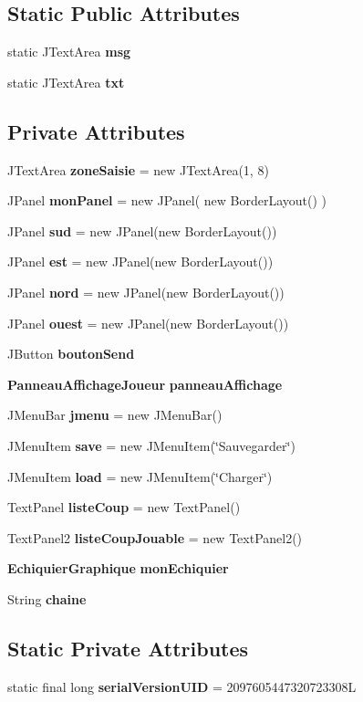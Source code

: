 \subsection*{Static Public Attributes}
\begin{DoxyCompactItemize}
\item 
static J\-Text\-Area {\bf msg}
\item 
static J\-Text\-Area {\bf txt}
\end{DoxyCompactItemize}
\subsection*{Private Attributes}
\begin{DoxyCompactItemize}
\item 
J\-Text\-Area {\bf zone\-Saisie} = new J\-Text\-Area(1, 8)
\item 
J\-Panel {\bf mon\-Panel} = new J\-Panel( new Border\-Layout() )
\item 
J\-Panel {\bf sud} = new J\-Panel(new Border\-Layout())
\item 
J\-Panel {\bf est} = new J\-Panel(new Border\-Layout())
\item 
J\-Panel {\bf nord} = new J\-Panel(new Border\-Layout())
\item 
J\-Panel {\bf ouest} = new J\-Panel(new Border\-Layout())
\item 
J\-Button {\bf bouton\-Send}
\item 
{\bf Panneau\-Affichage\-Joueur} {\bf panneau\-Affichage}
\item 
J\-Menu\-Bar {\bf jmenu} = new J\-Menu\-Bar()
\item 
J\-Menu\-Item {\bf save} = new J\-Menu\-Item(\char`\"{}Sauvegarder\char`\"{})
\item 
J\-Menu\-Item {\bf load} = new J\-Menu\-Item(\char`\"{}Charger\char`\"{})
\item 
Text\-Panel {\bf liste\-Coup} = new Text\-Panel()
\item 
Text\-Panel2 {\bf liste\-Coup\-Jouable} = new Text\-Panel2()
\item 
{\bf Echiquier\-Graphique} {\bf mon\-Echiquier}
\item 
String {\bf chaine}
\end{DoxyCompactItemize}
\subsection*{Static Private Attributes}
\begin{DoxyCompactItemize}
\item 
static final long {\bf serial\-Version\-U\-I\-D} = 2097605447320723308\-L
\end{DoxyCompactItemize}


